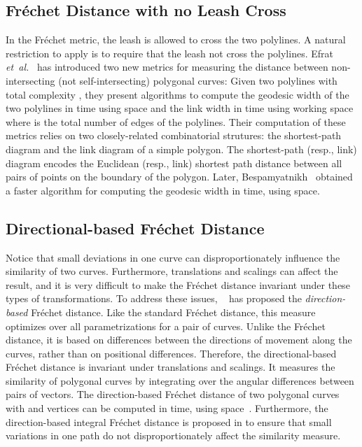 \documentclass[12pt]{dalthesis}
\newcommand{\etal}{{\em et~al.\/}}
\newcommand{\Frechet}{Fr\'echet }
\begin{document}
\subsection{\Frechet Distance with no Leash Cross}
In the \Frechet metric, the leash is allowed to cross the two polylines.
A natural restriction to apply is to require that the leash not cross the polylines.
Efrat \etal~\cite{GuibasNoCross} has introduced two new metrics 
for measuring the distance between non-intersecting 
(not self-intersecting) polygonal curves:
Given two polylines with total complexity , they 
present algorithms to compute the geodesic 
width of the two polylines in  time 
using  space and the link width 
in  time using  working space
 where  is the total number of edges of the
 polylines. Their computation of these metrics relies on two 
closely-related combinatorial 
strutures: the shortest-path diagram and the link diagram of a simple polygon.
The shortest-path (resp., link) diagram encodes the
Euclidean (resp., link) shortest path distance between 
all pairs of points on the boundary of the polygon. 
Later, Bespamyatnikh~\cite{BesNoCross} obtained a faster
algorithm for computing the geodesic width in  time, using  space.





\subsection{Directional-based \Frechet Distance}
Notice that small deviations in one curve can disproportionately 
influence the similarity of two curves.
Furthermore, translations and scalings can affect the result, 
and it is very difficult to make the \Frechet distance invariant under these
types of transformations.
To address these issues, ~\cite{Dir-FD} has proposed the 
{\em direction-based } \Frechet distance. 
Like the standard \Frechet distance, this measure
optimizes over all parametrizations for a pair of curves. Unlike the \Frechet
distance, it is based on differences between the directions of movement along the
curves, rather than on positional differences. 
Therefore, the directional-based \Frechet distance 
is invariant under translations and scalings.
It measures the similarity of polygonal curves by integrating over 
the angular differences between pairs of vectors.
The direction-based \Frechet distance of two polygonal curves with  and  vertices
can be computed in  time, using  space~\cite{Dir-FD}.
Furthermore, the direction-based integral \Frechet distance is proposed
in \cite{Dir-FD} to ensure that small variations in one path do not disproportionately affect the similarity measure.
\end{document}
